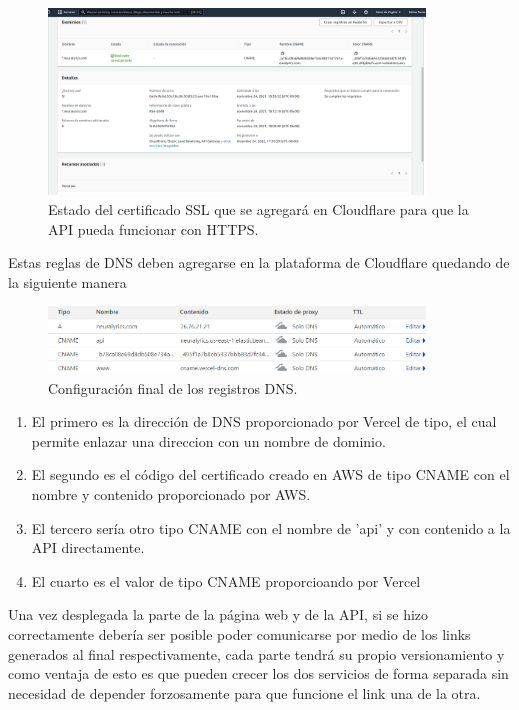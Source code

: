 \documentclass[12pt, a4paper, titlepage]{article}
\begin{document}
	
	\begin{figure}[H] 
		\includegraphics[width=10cm]{./Imagenes/DnsSSL/DNS_aws.png}
		\centering \caption{Estado del certificado SSL que se agregará en Cloudflare para que la API pueda funcionar con HTTPS.}
	\end{figure}
	Estas reglas de DNS deben agregarse en la plataforma de Cloudflare quedando de la siguiente manera 
	\begin{figure}[H] 
		\includegraphics[width=10cm]{./Imagenes/DnsSSL/Config_DNS.png}
		\centering \caption{Configuración final de los registros DNS.}
	\end{figure}
	\begin{enumerate}
	\item El primero es la dirección de DNS proporcionado por Vercel de tipo, el cual permite enlazar una direccion con un nombre de dominio.
	\item El segundo es el código del certificado creado en AWS de tipo CNAME con el nombre y contenido proporcionado por AWS.
	\item El tercero sería otro tipo CNAME con el nombre de 'api' y con contenido a la API directamente.
	\item El cuarto es el valor de tipo CNAME proporcioando por Vercel
	\end{enumerate}
	Una vez desplegada la parte de la página web y de la API, si se hizo correctamente debería ser posible poder comunicarse por medio de los links generados al final respectivamente, cada parte tendrá su propio versionamiento y como ventaja de esto es que pueden crecer los dos servicios de forma separada sin necesidad de depender forzosamente para que funcione el link una de la otra.
	\newpage
\end{document}

